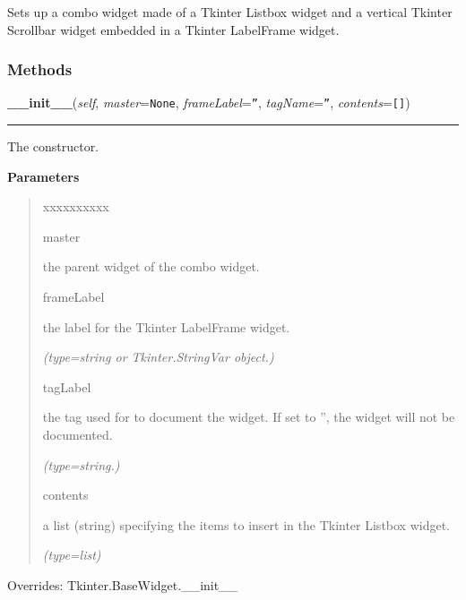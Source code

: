Sets up a combo widget made of a Tkinter Listbox widget and a vertical 
Tkinter Scrollbar widget embedded in a Tkinter LabelFrame widget.



  \subsubsection{Methods}

    \vspace{0.5ex}

\hspace{.8\funcindent}\begin{boxedminipage}{\funcwidth}

    \raggedright \textbf{\_\_init\_\_}(\textit{self}, \textit{master}={\tt None}, \textit{frameLabel}={\tt ''}, \textit{tagName}={\tt ''}, \textit{contents}={\tt []})

    \vspace{-1.5ex}

    \rule{\textwidth}{0.5\fboxrule}
\setlength{\parskip}{2ex}
    The constructor.

\setlength{\parskip}{1ex}
      \textbf{Parameters}
      \vspace{-1ex}

      \begin{quote}
        \begin{Ventry}{xxxxxxxxxx}

          \item[master]

          the parent widget of the combo widget.

          \item[frameLabel]

          the label for the Tkinter LabelFrame widget.

            {\it (type=string or Tkinter.StringVar object.)}

          \item[tagLabel]

          the tag used for to document the widget. If set to '', the widget
          will not be documented.

            {\it (type=string.)}

          \item[contents]

          a list (string) specifying the items to insert in the Tkinter 
          Listbox widget.

            {\it (type=list)}

        \end{Ventry}

      \end{quote}

      Overrides: Tkinter.BaseWidget.\_\_init\_\_

    \end{boxedminipage}

